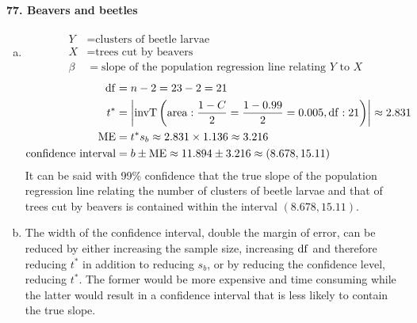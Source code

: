 \documentclass[../Homework]{subfiles}
\begin{document}
		\paragraph{77. Beavers and beetles}
			\begin{enumerate}[a.]
				\item
					\begin{align*}
						Y &= \text{clusters of beetle larvae} \\
						X &= \text{trees cut by beavers} \\
						\beta &= \text{slope of the population regression line relating $Y$ to $X$}
					\end{align*}
					\begin{align*}
						\operatorname{df} &= n - 2 = 23 - 2 = 21 \\
						t^* &= \left|\operatorname{invT}\left(\operatorname{area}: \frac{1 - C}{2} = \frac{1 - 0.99}{2} = 0.005, \operatorname{df}: 21\right)\right| \approx 2.831 \\
						\operatorname{ME} &= t^*s_b \approx 2.831 \times 1.136 \approx 3.216 \\
						\text{confidence interval} &= b \pm \operatorname{ME} \approx 11.894 \pm 3.216 \approx (8.678, 15.11)
					\end{align*}
					It can be said with 99\% confidence that the true slope of the population regression line relating the number of clusters of beetle larvae and that of trees cut by beavers is contained within the interval $(8.678, 15.11)$.
				\item
					The width of the confidence interval, double the margin of error, can be reduced by either increasing the sample size, increasing $\operatorname{df}$ and therefore reducing $t^*$ in addition to reducing $s_b$, or by reducing the confidence level, reducing $t^*$. The former would be more expensive and time consuming while the latter would result in a confidence interval that is less likely to contain the true slope.
			\end{enumerate}
\end{document}
